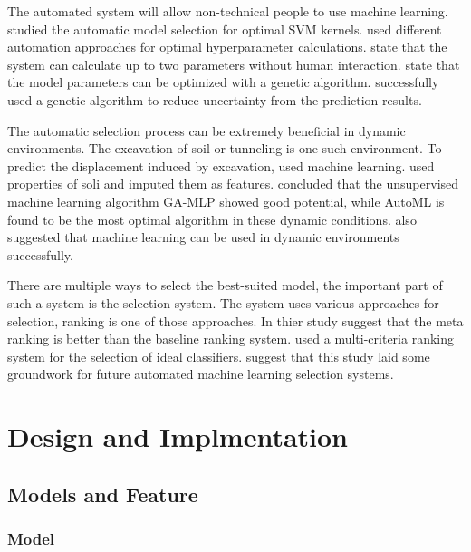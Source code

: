 \documentclass[a4paper,fleqn]{cas-dc}
\begin{document}
The automated system will allow non-technical people to use machine learning. \cite*{ref_paper_3} studied the automatic model selection for optimal SVM kernels. \citeauthor{ref_paper_3} used different automation approaches for optimal hyperparameter calculations. \citeauthor{ref_paper_3} state that the system can calculate up to two parameters without human interaction. \cite*{ref_paper_39} state that the model parameters can be optimized with a genetic algorithm. \citeauthor{ref_paper_39} successfully used a genetic algorithm to reduce uncertainty from the prediction results.

The automatic selection process can be extremely beneficial in dynamic environments. The excavation of soil or tunneling is one such environment. To predict the displacement induced by excavation, \cite*{ref_paper_1} used machine learning. \citeauthor{ref_paper_1} used properties of soli and imputed them as features. \citeauthor{ref_paper_1} concluded that the unsupervised machine learning algorithm GA-MLP showed good potential, while AutoML is found to be the most optimal algorithm in these dynamic conditions. \cite*{ref_paper_13} also suggested that machine learning can be used in dynamic environments successfully.

There are multiple ways to select the best-suited model, the important part of such a system is the selection system. The system uses various approaches for selection, ranking is one of those approaches. In thier study \cite*{ref_paper_23} suggest that the meta ranking is better than the baseline ranking system. \citeauthor{ref_paper_23} used a multi-criteria ranking system for the selection of ideal classifiers. \citeauthor{ref_paper_23} suggest that this study laid some groundwork for future automated machine learning selection systems.

\section{Design and Implmentation}\label{sec:design_and_implmentation}

\subsection{Models and Feature}\label{subsec:model_and_feature}

\subsubsection{Model}\label{subsubsec:model}
\end{document}
